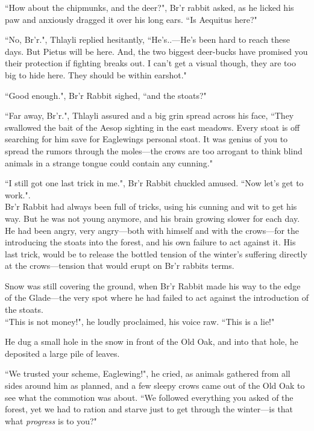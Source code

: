 ``How about the chipmunks, and the deer?", Br'r rabbit asked, as he licked his paw and anxiously dragged it over his long ears. ``Is Aequitus here?"

``No, Br'r.", Thlayli replied hesitantly, ``He's..---He's been hard to reach these days. But Pietus will be here. And, the two biggest deer-bucks have promised you their protection if fighting breaks out. I can't get a visual though, they are too big to hide here. They should be within earshot."

``Good enough.", Br'r Rabbit sighed, ``and the stoats?"

``Far away, Br'r.", Thlayli assured and a big grin spread across his face, ``They swallowed the bait of the Aesop sighting in the east meadows. Every stoat is off searching for him save for Eaglewings personal stoat. It was genius of you to spread the rumors through the moles---the crows are too arrogant to think blind animals in a strange tongue could contain any cunning."

``I still got one last trick in me.", Br'r Rabbit chuckled amused. ``Now let's get to work.".\\

Br'r Rabbit had always been full of tricks, using his cunning and wit to get his way. But he was not young anymore, and his brain growing slower for each day. He had been angry, very angry---both with himself and with the crows---for the introducing the stoats into the forest, and his own failure to act against it. His last trick, would be to release the bottled tension of the winter's suffering directly at the crows---tension that would erupt on Br'r rabbits terms.

Snow was still covering the ground, when Br'r Rabbit made his way to the edge of the Glade---the very spot where he had failed to act against the introduction of the stoats.\\

``This is not money!", he loudly proclaimed, his voice raw. ``This is a lie!"

He dug a small hole in the snow in front of the Old Oak, and into that hole, he deposited a large pile of leaves.

``We trusted your scheme, Eaglewing!", he cried, as animals gathered from all sides around him as planned, and a few sleepy crows came out of the Old Oak to see what the commotion was about. ``We followed everything you asked of the forest, yet we had to ration and starve just to get through the winter---is that what \textit{progress} is to you?"


